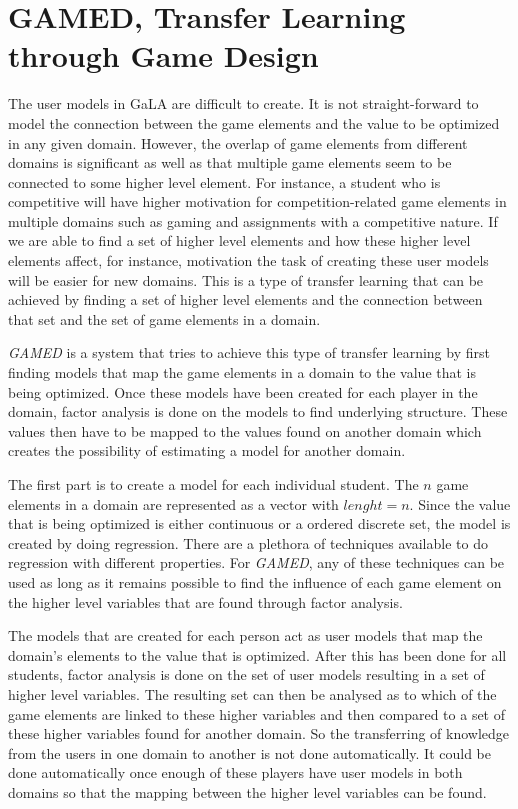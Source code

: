 \documentclass[11pt]{article}
\begin{document}
\section{GAMED, Transfer Learning through Game Design}
The user models in GaLA are difficult to create. It is not straight-forward to model the connection between the game elements and the value to be optimized in any given domain. However, the overlap of game elements from different domains is significant as well as that multiple game elements seem to be connected to some higher level element. For instance, a student who is competitive will have higher motivation for competition-related game elements in multiple domains such as gaming and assignments with a competitive nature. If we are able to find a set of higher level elements and how these higher level elements affect, for instance, motivation the task of creating these user models will be easier for new domains. This is a type of transfer learning that can be achieved by finding a set of higher level elements and the connection between that set and the set of game elements in a domain. 

\emph{GAMED} is a system that tries to achieve this type of transfer learning by first finding models that map the game elements in a domain to the value that is being optimized. Once these models have been created for each player in the domain, factor analysis is done on the models to find underlying structure. These values then have to be mapped to the values found on another domain which creates the possibility of estimating a model for another domain.

The first part is to create a model for each individual student. The $n$ game elements in a domain are represented as a vector with $lenght=n$. Since the value that is being optimized is either continuous or a ordered discrete set, the model is created by doing regression. There are a plethora of techniques available to do regression with different properties. For \emph{GAMED}, any of these techniques can be used as long as it remains possible to find the influence of each game element on the higher level variables that are found through factor analysis. 

The models that are created for each person act as user models that map the domain's elements to the value that is optimized. After this has been done for all students, factor analysis is done on the set of user models resulting in a set of higher level variables. The resulting set can then be analysed as to which of the game elements are linked to these higher variables and then compared to a set of these higher variables found for another domain. So the transferring of knowledge from the users in one domain to another is not done automatically. It could be done automatically once enough of these players have user models in both domains so that the mapping between the higher level variables can be found.
\end{document}
